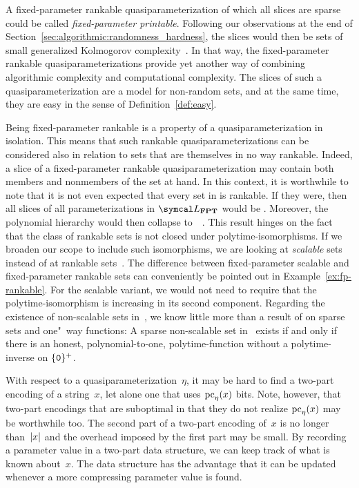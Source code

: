 A fixed-parameter \pdash{}rankable quasiparameterization of which all slices are sparse could be called \emph{fixed-parameter \pdash{}printable}.
Following our observations at the end of Section~\ref{sec:algorithmic:randomness_hardness}, the slices would then be sets of small generalized Kolmogorov complexity~\parencite{allender1988p-printable}.
In that way, the fixed-parameter \pdash{}rankable quasiparameterizations provide yet another way of combining algorithmic complexity and computational complexity.
The slices of such a quasiparameterization are a model for non-random sets, and at the same time, they are easy in the sense of Definition~\ref{def:easy}.

Being fixed-parameter \pdash{}rankable is a property of a quasiparameterization in isolation.
This means that such rankable quasiparameterizations can be considered also in relation to sets that are themselves in no way \pdash{}rankable.
Indeed, a slice of a fixed-parameter \pdash{}rankable quasiparameterization may contain both members and nonmembers of the set at hand.
In this context, it is worthwhile to note that it is not even expected that every set in  is \pdash{}rankable.
If they were, then all slices of all parameterizations in $\calL_\cl{FPT}$ would be .
Moreover, the polynomial hierarchy would then collapse to~~\parencite{hemachandra1990complexity}.
This result hinges on the fact that the class of rankable sets is not closed under polytime-isomorphisms.
If we broaden our scope to include such isomorphisms, we are looking at \emph{scalable} sets instead of at rankable sets~\parencite{goldsmith1996scalability}.
The difference between fixed-parameter scalable and fixed-parameter \pdash{}rankable sets can conveniently be pointed out in Example~\ref{ex:fp-rankable}.
For the scalable variant, we would not need to require that the polytime-isomorphism is increasing in its second component.
Regarding the existence of non-scalable sets in~, we know little more than a result of \textcite{allender1986complexity} on sparse sets and one"~way functions:
A sparse non-scalable set in~ exists if and only if there is an honest, polynomial-to-one, polytime-function without a polytime-inverse on $\{\textnormal{\texttt{0}}\}^+$.

With respect to a quasiparameterization~$\eta$, it may be hard to find a two-part encoding of a string~$x$, let alone one that uses $\operatorname{pc}_\eta(x)$ bits.
Note, however, that two-part encodings that are suboptimal in that they do not realize $\operatorname{pc}_\eta(x)$ may be worthwhile too.
The second part of a two-part encoding of~$x$ is no longer than~${\lvert x\rvert}$ and the overhead imposed by the first part may be small.
By recording a parameter value in a two-part data structure, we can keep track of what is known about~$x$.
The data structure has the advantage that it can be updated whenever a more compressing parameter value is found.

